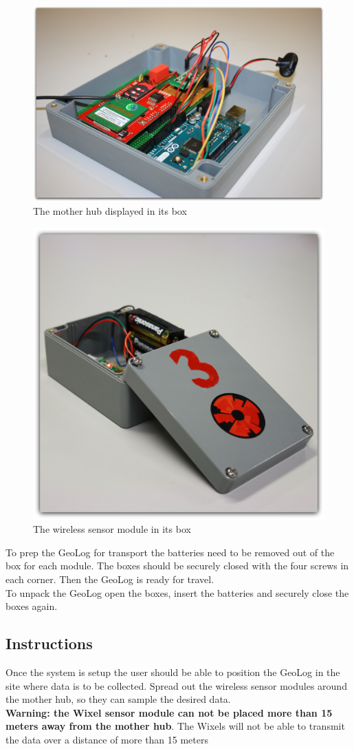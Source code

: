 \begin{figure}[H]
\centering
\includegraphics[width=0.6\linewidth]{graphics/Main_Open.jpg}
\caption{The mother hub displayed in its box\label{fig:Main_Open}}
\end{figure}
\begin{figure}[H]
\centering
\includegraphics[width=0.6\linewidth]{graphics/Wixel_sensor.jpg}
\caption{The wireless sensor module in its box\label{fig:Wixel_sensor}}
\end{figure}

To prep the GeoLog for transport the batteries need to be removed out of the box for each module. The boxes should be securely closed with the four screws in each corner. Then the GeoLog is ready for travel.\\
To unpack the GeoLog open the boxes, insert the batteries and securely close the boxes again.

\subsection{Instructions}
Once the system is setup the user should be able to position the GeoLog in the site where data is to be collected. Spread out the wireless sensor modules around the mother hub, so they can sample the desired data.\\
\textbf{Warning: the Wixel sensor module can not be placed more than 15 meters away from the mother hub}. The Wixels will not be able to transmit the data over a distance of more than 15 meters\\







